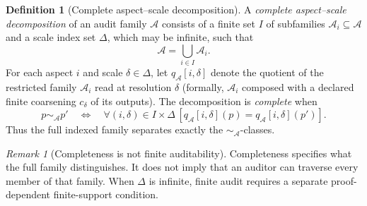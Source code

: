\documentclass[11pt]{article}
\newcommand{\eqA}{\mathrel{\sim_{\mathcal A}}}
\newcommand{\qA}{q_{\mathcal A}}
\newcommand{\mcA}{\mathcal A}
\theoremstyle{plain}
\theoremstyle{definition}
\newtheorem{definition}[theorem]{Definition}
\theoremstyle{remark}
\newtheorem{remark}[theorem]{Remark}
\begin{document}
\begin{definition}[Complete aspect--scale decomposition]
\label{def:aspects}
A \emph{complete aspect--scale decomposition} of an audit family $\mcA$ consists
of a finite set $I$ of subfamilies $\mcA_i\subseteq\mcA$ and a scale index set
$\Delta$, which may be infinite, such that
\[
  \mcA=\bigcup_{i\in I}\mcA_i.
\]
For each aspect $i$ and scale $\delta\in\Delta$, let $\qA[i,\delta]$ denote the
quotient of the restricted family $\mcA_i$ read at resolution $\delta$
(formally, $\mcA_i$ composed with a declared finite coarsening
$c_\delta$ of its outputs).  The decomposition is \emph{complete} when
\[
  p\eqA p'
  \quad\Longleftrightarrow\quad
  \forall (i,\delta)\in I\times\Delta\,
  [\qA[i,\delta](p)=\qA[i,\delta](p')].
\]
Thus the full indexed family separates exactly the $\eqA$-classes.
\end{definition}

\begin{remark}[Completeness is not finite auditability]
\label{rem:complete-not-finite}
Completeness specifies what the full family distinguishes.  It does not imply
that an auditor can traverse every member of that family.  When $\Delta$ is
infinite, finite audit requires a separate proof-dependent finite-support
condition.
\end{remark}
\end{document}
